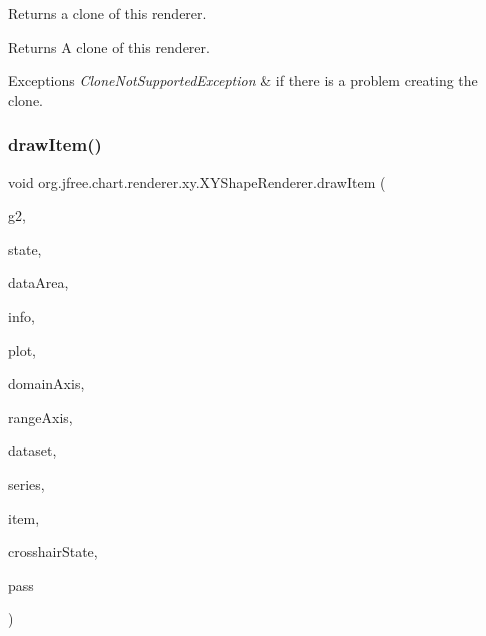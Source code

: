 Returns a clone of this renderer.

\begin{DoxyReturn}{Returns}
A clone of this renderer.
\end{DoxyReturn}

\begin{DoxyExceptions}{Exceptions}
{\em Clone\+Not\+Supported\+Exception} & if there is a problem creating the clone. \\
\hline
\end{DoxyExceptions}
\mbox{\label{classorg_1_1jfree_1_1chart_1_1renderer_1_1xy_1_1_x_y_shape_renderer_a3ad0051255b00a4c3045c21ed8198b34}} 
\subsubsection{\texorpdfstring{draw\+Item()}{drawItem()}}
{\footnotesize\ttfamily void org.\+jfree.\+chart.\+renderer.\+xy.\+X\+Y\+Shape\+Renderer.\+draw\+Item (\begin{DoxyParamCaption}\item[{Graphics2D}]{g2,  }\item[{\mbox{\hyperlink{classorg_1_1jfree_1_1chart_1_1renderer_1_1xy_1_1_x_y_item_renderer_state}{X\+Y\+Item\+Renderer\+State}}}]{state,  }\item[{Rectangle2D}]{data\+Area,  }\item[{\mbox{\hyperlink{classorg_1_1jfree_1_1chart_1_1plot_1_1_plot_rendering_info}{Plot\+Rendering\+Info}}}]{info,  }\item[{\mbox{\hyperlink{classorg_1_1jfree_1_1chart_1_1plot_1_1_x_y_plot}{X\+Y\+Plot}}}]{plot,  }\item[{\mbox{\hyperlink{classorg_1_1jfree_1_1chart_1_1axis_1_1_value_axis}{Value\+Axis}}}]{domain\+Axis,  }\item[{\mbox{\hyperlink{classorg_1_1jfree_1_1chart_1_1axis_1_1_value_axis}{Value\+Axis}}}]{range\+Axis,  }\item[{\mbox{\hyperlink{interfaceorg_1_1jfree_1_1data_1_1xy_1_1_x_y_dataset}{X\+Y\+Dataset}}}]{dataset,  }\item[{int}]{series,  }\item[{int}]{item,  }\item[{\mbox{\hyperlink{classorg_1_1jfree_1_1chart_1_1plot_1_1_crosshair_state}{Crosshair\+State}}}]{crosshair\+State,  }\item[{int}]{pass }\end{DoxyParamCaption})}

